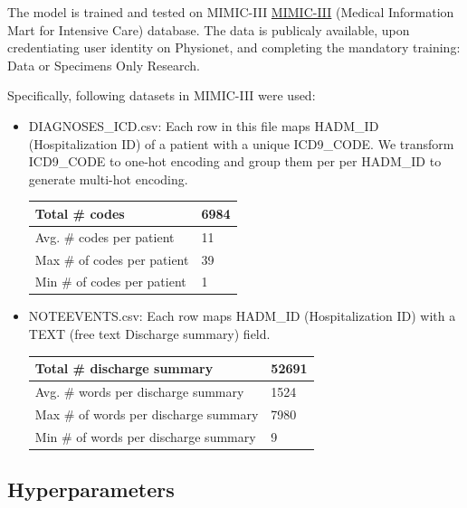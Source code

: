 \documentclass[11pt,a4paper]{article}
\begin{document}
The model is trained and tested on MIMIC-III \href{https://physionet.org/content/mimiciii/1.4/}{MIMIC-III} (Medical Information Mart for Intensive Care) database. The data is publicaly available, upon credentiating user identity on Physionet, and completing the mandatory training: Data or Specimens Only Research.

Specifically, following datasets in MIMIC-III were used:

\begin{itemize}
    \item DIAGNOSES\_ICD.csv: Each row in this file maps HADM\_ID (Hospitalization ID) of a patient with a unique ICD9\_CODE. We transform ICD9\_CODE to one-hot encoding and group them per per HADM\_ID to generate multi-hot encoding.
\newline

\begin{small}
\begin{tabular}{ ll }
  \hline
  	Total \# codes & 6984 \\
  \hline
  	Avg. \# codes per patient & 11 \\
  \hline
  	Max \# of codes per patient & 39 \\
  \hline
  	Min \# of codes per patient & 1 \\
  \hline
\end{tabular}
\end{small}

	\item NOTEEVENTS.csv: Each row maps HADM\_ID (Hospitalization ID) with a TEXT (free text Discharge summary) field.
\newline

\begin{small}
\begin{tabular}{ ll }
  \hline
    Total \# discharge summary & 52691 \\
  \hline
    Avg. \# words per discharge summary & 1524 \\ 
  \hline
    Max \# of words per discharge summary & 7980 \\
  \hline
  	Min \# of words per discharge summary & 9 \\
  \hline
\end{tabular}
\end{small}
\end{itemize}


\subsection{Hyperparameters}
\end{document}
